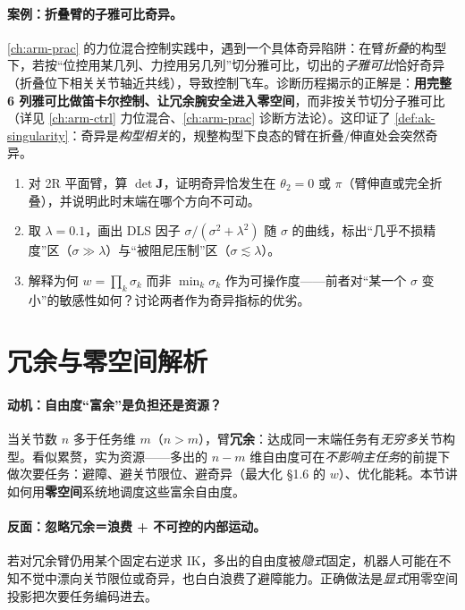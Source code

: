 \paragraph{案例：折叠臂的子雅可比奇异。}
\cref{ch:arm-prac} 的力位混合控制实践中，遇到一个具体奇异陷阱：在臂\emph{折叠}的构型下，若按“位控用某几列、力控用另几列”切分雅可比，切出的\emph{子雅可比}恰好奇异（折叠位下相关关节轴近共线），导致控制飞车。诊断历程揭示的正解是：\textbf{用完整 6 列雅可比做笛卡尔控制、让冗余腕安全进入零空间}，而非按关节切分子雅可比（详见 \cref{ch:arm-ctrl} 力位混合、\cref{ch:arm-prac} 诊断方法论）。这印证了 \cref{def:ak-singularity}：奇异是\emph{构型相关}的，规整构型下良态的臂在折叠/伸直处会突然奇异。

\begin{practice}
\begin{enumerate}
  \item 对 2R 平面臂，算 $\det\mathbf{J}$，证明奇异恰发生在 $\theta_2=0$ 或 $\pi$（臂伸直或完全折叠），并说明此时末端在哪个方向不可动。
  \item 取 $\lambda=0.1$，画出 DLS 因子 $\sigma/(\sigma^2+\lambda^2)$ 随 $\sigma$ 的曲线，标出“几乎不损精度”区（$\sigma\gg\lambda$）与“被阻尼压制”区（$\sigma\lesssim\lambda$）。
  \item 解释为何 $w=\prod_k\sigma_k$ 而非 $\min_k\sigma_k$ 作为可操作度——前者对“某一个 $\sigma$ 变小”的敏感性如何？讨论两者作为奇异指标的优劣。
\end{enumerate}
\end{practice}

\section{冗余与零空间解析}
\label{sec:ak-redundancy}

\paragraph{动机：自由度“富余”是负担还是资源？}
当关节数 $n$ 多于任务维 $m$（$n>m$），臂\textbf{冗余}：达成同一末端任务有\emph{无穷多}关节构型。看似累赘，实为资源——多出的 $n-m$ 维自由度可在\emph{不影响主任务}的前提下做次要任务：避障、避关节限位、避奇异（最大化 §1.6 的 $w$）、优化能耗。本节讲如何用\textbf{零空间}系统地调度这些富余自由度。

\paragraph{反面：忽略冗余＝浪费 + 不可控的内部运动。}
若对冗余臂仍用某个固定右逆求 IK，多出的自由度被\emph{隐式}固定，机器人可能在不知不觉中漂向关节限位或奇异，也白白浪费了避障能力。正确做法是\emph{显式}用零空间投影把次要任务编码进去。


